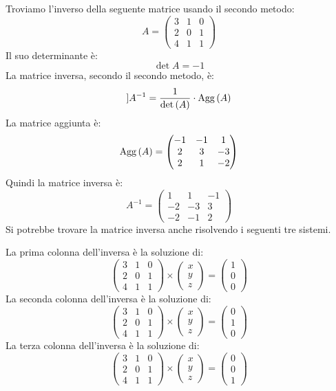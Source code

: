 \begin{exmp}
Troviamo l'inverso della seguente matrice usando il secondo metodo:
\[
A =
\begin{pmatrix}
3 & 1 & 0 \\
2 & 0 & 1 \\
4 & 1 & 1
\end{pmatrix}
\]
Il suo determinante \`e:
\[
\det{A} = -1
\]
La matrice inversa, secondo il secondo metodo, \`e:
\[]
A^{-1} = \frac{1}{\operatorname{det} \left({A}\right)} \cdot \operatorname{Agg} \left( {A} \right)
\]
La matrice aggiunta \`e:
\[
\operatorname{Agg} \left( {A} \right) = 
\begin{pmatrix}
-1 & -1 & 1 \\
2 & 3 & -3 \\
2 & 1 & -2
\end{pmatrix}
\]
Quindi la matrice inversa \`e:
\[
A^{-1} =
\begin{pmatrix}
1 & 1 & -1 \\
-2 & -3 & 3 \\
-2 & -1 & 2
\end{pmatrix}
\]
Si potrebbe trovare la matrice inversa anche risolvendo i seguenti tre sistemi.

La prima colonna dell'inversa \`e la soluzione di:
\[
\begin{pmatrix}
3 & 1 & 0 \\
2 & 0 & 1 \\
4 & 1 & 1
\end{pmatrix}
\times
\begin{pmatrix}
x \\ y \\ z
\end{pmatrix}
= 
\begin{pmatrix}
1 \\ 0 \\ 0
\end{pmatrix}
\]
La seconda colonna dell'inversa \`e la soluzione di:
\[
\begin{pmatrix}
3 & 1 & 0 \\
2 & 0 & 1 \\
4 & 1 & 1
\end{pmatrix}
\times
\begin{pmatrix}
x \\ y \\ z
\end{pmatrix}
= 
\begin{pmatrix}
0 \\ 1 \\ 0
\end{pmatrix}
\]
La terza colonna dell'inversa \`e la soluzione di:
\[
\begin{pmatrix}
3 & 1 & 0 \\
2 & 0 & 1 \\
4 & 1 & 1
\end{pmatrix}
\times
\begin{pmatrix}
x \\ y \\ z
\end{pmatrix}
= 
\begin{pmatrix}
0 \\ 0 \\ 1
\end{pmatrix}
\]
\end{exmp}

